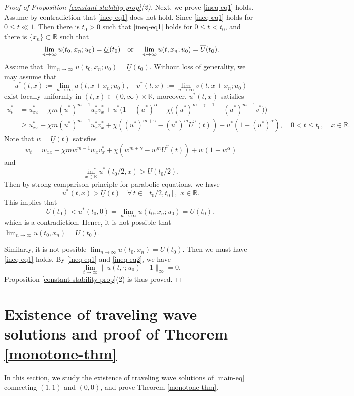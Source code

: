 \documentclass[11pt]{article} %
\theoremstyle{remark}
\theoremstyle{remark}
\numberwithin{equation}{section}
\numberwithin{figure}{section}
\numberwithin{table}{section}
\newcommand\RR{\ensuremath{\mathbb{R}}}
\begin{document}
\begin{proof}[Proof of Proposition \ref{constant-stability-prop}(2)]
Next, we prove \eqref{ineq-eq1} holds. Assume by contradiction that \eqref{ineq-eq1} 
does not hold. Since \eqref{ineq-eq1} holds for $0\le t\ll 1$. Then there is $t_0>0$ such that
\eqref{ineq-eq1} holds for $0\le t<t_0$, and there is $\{x_n\}\subset\RR$ such that
$$
\lim_{n\to\infty} u(t_0,x_n;u_0)=\underline U(t_0)\quad {\rm or}\quad \lim_{n\to\infty} u(t,x_n;u_0)=\overline U(t_0).
$$
Assume that $\lim_{n\to\infty} u(t_0,x_n;u_0)=\underline U(t_0)$.  Without loss of generality, we may assume that
$$
u^*(t,x):=\lim_{n\to\infty}u(t,x+x_n;u_0), \quad v^*(t,x):=\lim_{n\to\infty} v(t,x+x_n;u_0)
$$
exist locally uniformly in $(t,x)\in (0,\infty)\times \RR$, moreover, $u^*(t,x)$ satisfies
\begin{align*}
u^*_t&=u^*_{xx}-\chi m (u^*)^{m-1} u^*_x v^*_x+u^* \Big(1-(u^*)^\alpha +\chi\big( (u^*)^{m+\gamma -1}-(u^*)^{m-1} v^*\big)\Big)\\
&\ge   u^*_{xx}-\chi m (u^*)^{m-1} u^*_x v^*_x +\chi ((u^*)^{m+\gamma}- (u^*)^m \overline U^{\gamma}(t))+ u^*(1-(u^*)^\alpha),\quad 0<t\le t_0,\quad x\in\RR.
\end{align*}
Note that  $w=\underline U(t)$ satisfies
$$
w_t=w_{xx}-\chi m w^{m-1} w_{x} v^*_x + \chi(w^{m+\gamma}-w^m \overline U^{\gamma}(t))+w(1-w^{\alpha})
$$
and
$$
\inf_{x\in\RR} u^*(t_0/2,x )>\underline U(t_0/2).
$$
Then by strong comparison principle for parabolic equations, we have
$$
u^*(t,x)>\underline U(t)\quad \forall\, t\in [t_0/2,t_0],\,\, x\in\RR.
$$
This implies that
$$
\underline U(t_0)< u^*(t_0,0)=\lim_{n\to\infty} u(t_0,x_n;u_0)=\underline U(t_0),
$$
which is a contradiction.
Hence, it is not possible that $\lim_{n\to\infty} u(t_0,x_n)=\underline U(t_0)$.



Similarly, it is not possible $\lim_{n\to\infty} u(t_0,x_n)=\overline U(t_0)$. Then we must have \eqref{ineq-eq1} holds. By \eqref{ineq-eq1} and \eqref{ineq-eq2}, we have
$$
\lim_{t\to\infty}\|u(t,\cdot;u_0)-1\|_\infty=0.
$$
 Proposition \ref{constant-stability-prop}(2) is thus proved.
\end{proof}



\section{Existence of traveling wave solutions and proof of Theorem \ref{monotone-thm}}
\label{existence-section}


In this section, we study the existence of traveling wave solutions of \eqref{main-eq} connecting
$(1,1)$ and $(0,0)$, and prove Theorem \ref{monotone-thm}.
\end{document}
